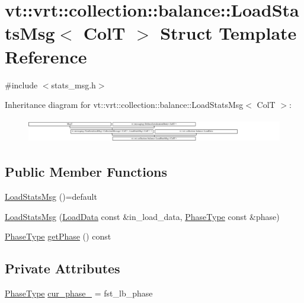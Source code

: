 \hypertarget{structvt_1_1vrt_1_1collection_1_1balance_1_1_load_stats_msg}{}\section{vt\+:\+:vrt\+:\+:collection\+:\+:balance\+:\+:Load\+Stats\+Msg$<$ ColT $>$ Struct Template Reference}
\label{structvt_1_1vrt_1_1collection_1_1balance_1_1_load_stats_msg}


{\ttfamily \#include $<$stats\+\_\+msg.\+h$>$}

Inheritance diagram for vt\+:\+:vrt\+:\+:collection\+:\+:balance\+:\+:Load\+Stats\+Msg$<$ ColT $>$\+:\begin{figure}[H]
\begin{center}
\leavevmode
\includegraphics[height=1.070746cm]{structvt_1_1vrt_1_1collection_1_1balance_1_1_load_stats_msg}
\end{center}
\end{figure}
\subsection*{Public Member Functions}
\begin{DoxyCompactItemize}
\item 
\hyperlink{structvt_1_1vrt_1_1collection_1_1balance_1_1_load_stats_msg_acb37915875685edfc80d6282cd493a58}{Load\+Stats\+Msg} ()=default
\item 
\hyperlink{structvt_1_1vrt_1_1collection_1_1balance_1_1_load_stats_msg_a070605d1d3f9a70f7a8681d0f5fc827b}{Load\+Stats\+Msg} (\hyperlink{structvt_1_1vrt_1_1collection_1_1balance_1_1_load_data}{Load\+Data} const \&in\+\_\+load\+\_\+data, \hyperlink{namespacevt_a46ce6733d5cdbd735d561b7b4029f6d7}{Phase\+Type} const \&phase)
\item 
\hyperlink{namespacevt_a46ce6733d5cdbd735d561b7b4029f6d7}{Phase\+Type} \hyperlink{structvt_1_1vrt_1_1collection_1_1balance_1_1_load_stats_msg_acfce435d77d32952996e334701fe28ed}{get\+Phase} () const
\end{DoxyCompactItemize}
\subsection*{Private Attributes}
\begin{DoxyCompactItemize}
\item 
\hyperlink{namespacevt_a46ce6733d5cdbd735d561b7b4029f6d7}{Phase\+Type} \hyperlink{structvt_1_1vrt_1_1collection_1_1balance_1_1_load_stats_msg_ae720b043f578372906449227375aeaf4}{cur\+\_\+phase\+\_\+} = fst\+\_\+lb\+\_\+phase
\end{DoxyCompactItemize}
